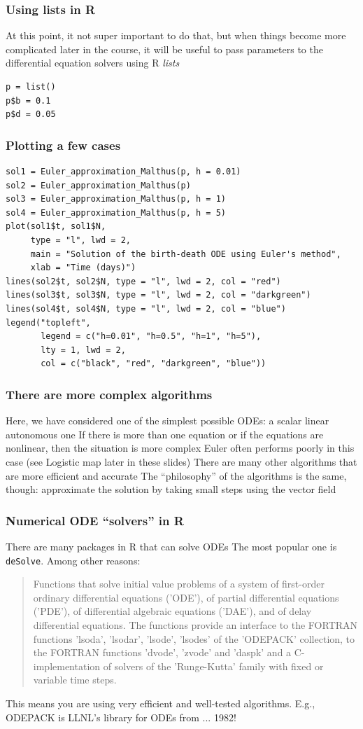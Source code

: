 \documentclass[aspectratio=169]{beamer}
\begin{document}
\begin{frame}[fragile]\frametitle{Using lists in R}
At this point, it not super important to do that, but when things become more complicated later in the course, it will be useful to pass parameters to the differential equation solvers using R \emph{lists}
\vfill
\begin{lstlisting}
p = list()
p$b = 0.1
p$d = 0.05
\end{lstlisting}
\end{frame}



\begin{frame}[fragile]\frametitle{Plotting a few cases}
\begin{lstlisting}
sol1 = Euler_approximation_Malthus(p, h = 0.01)
sol2 = Euler_approximation_Malthus(p)
sol3 = Euler_approximation_Malthus(p, h = 1)
sol4 = Euler_approximation_Malthus(p, h = 5)
plot(sol1$t, sol1$N,
     type = "l", lwd = 2,
     main = "Solution of the birth-death ODE using Euler's method",
     xlab = "Time (days)")
lines(sol2$t, sol2$N, type = "l", lwd = 2, col = "red")
lines(sol3$t, sol3$N, type = "l", lwd = 2, col = "darkgreen")
lines(sol4$t, sol4$N, type = "l", lwd = 2, col = "blue")
legend("topleft",
       legend = c("h=0.01", "h=0.5", "h=1", "h=5"),
       lty = 1, lwd = 2,
       col = c("black", "red", "darkgreen", "blue"))
\end{lstlisting}
\end{frame}


\begin{frame}\frametitle{There are more complex algorithms}
Here, we have considered one of the simplest possible ODEs: a scalar linear autonomous one
\vfill
If there is more than one equation or if the equations are nonlinear, then the situation is more complex
\vfill
Euler often performs poorly in this case (see Logistic map later in these slides)
\vfill
There are many other algorithms that are more efficient and accurate
\vfill
The ``philosophy'' of the algorithms is the same, though: approximate the solution by taking small steps using the vector field
\end{frame}

\begin{frame}\frametitle{Numerical ODE ``solvers'' in R}
There are many packages in R that can solve ODEs
\vfill
The most popular one is \texttt{deSolve}. Among other reasons:
\vfill
\begin{quote}
Functions that solve initial value problems of a system of first-order ordinary differential equations ('ODE'), of partial differential equations ('PDE'), of differential algebraic equations ('DAE'), and of delay differential equations. The functions provide an interface to the FORTRAN functions 'lsoda', 'lsodar', 'lsode', 'lsodes' of the 'ODEPACK' collection, to the FORTRAN functions 'dvode', 'zvode' and 'daspk' and a C-implementation of solvers of the 'Runge-Kutta' family with fixed or variable time steps.
\end{quote}
\vfill
This means you are using very efficient and well-tested algorithms. E.g., ODEPACK is LLNL's library for ODEs from ... 1982!
\end{frame}
\end{document}
